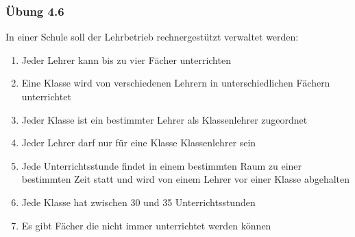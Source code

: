 \begin{frame}
\frametitle{Übung 4.6}
	In einer Schule soll der Lehrbetrieb rechnergestützt verwaltet werden:
	\begin{enumerate}
		\item Jeder Lehrer kann bis zu vier Fächer unterrichten
		\item Eine Klasse wird von verschiedenen Lehrern in unterschiedlichen Fächern unterrichtet
		\item Jeder Klasse ist ein bestimmter Lehrer als Klassenlehrer zugeordnet
		\item Jeder Lehrer darf nur für eine Klasse Klassenlehrer sein
		\item Jede Unterrichtsstunde findet in einem bestimmten Raum zu einer bestimmten Zeit statt
		und wird von einem Lehrer vor einer Klasse abgehalten
		\item Jede Klasse hat zwischen 30 und 35 Unterrichtsstunden
		\item Es gibt Fächer die nicht immer unterrichtet werden können
	\end{enumerate}
\end{frame}
